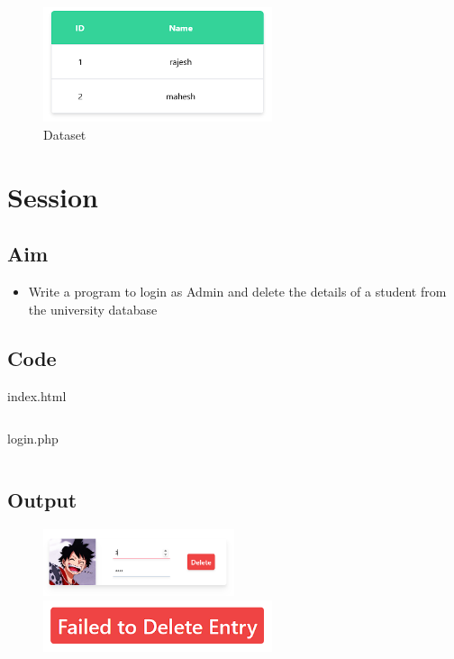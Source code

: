 \documentclass{article}
\begin{document}
\begin{figure}[h!]
	\centering
  \caption{Dataset}
	\includegraphics[width=0.6\textwidth]{./Assets/p2708.png}
\end{figure}
\newpage

\section{Session}
\subsection{Aim}
\begin{itemize}
  \item Write a program to login as Admin and delete the details of a student from the university database
\end{itemize}

\subsection{Code}
index.html
\inputminted[frame=lines, breaklines, breakanywhere, numberblanklines=false]{html}{./prog_27/index.html}
login.php
\inputminted[frame=lines, breaklines, breakanywhere, numberblanklines=false]{php}{./prog_27/login.php}

\subsection{Output}
\begin{figure}[h!]
	\centering
	\includegraphics[width=0.5\textwidth]{./Assets/p2704.png}
	\includegraphics[width=0.6\textwidth]{./Assets/p2705.png}
\end{figure}
\newpage
\end{document}
